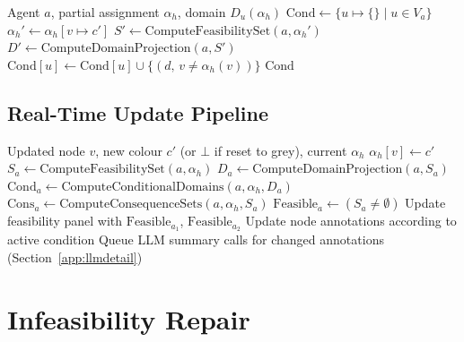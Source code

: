 \documentclass[10pt]{article}
\theoremstyle{definition}
\begin{document}
\begin{algorithm}
\caption{ComputeConditionalDomains: single-change conditional entries}
\label{alg:conditional}
\begin{algorithmic}[1]
\REQUIRE Agent $a$, partial assignment $\alpha_h$, domain $D_u(\alpha_h)$
\STATE $\mathrm{Cond} \gets \{u \mapsto \{\} \mid u \in V_a\}$
    \STATE $\alpha_h' \gets \alpha_h[v \mapsto c']$
    \STATE $S' \gets \text{ComputeFeasibilitySet}(a, \alpha_h')$
    \STATE $D' \gets \text{ComputeDomainProjection}(a, S')$
        \STATE $\mathrm{Cond}[u] \gets \mathrm{Cond}[u] \cup \{(d,\, v \neq \alpha_h(v))\}$
      \ENDFOR
    \ENDFOR
  \ENDFOR
\ENDFOR
\RETURN $\mathrm{Cond}$
\end{algorithmic}
\end{algorithm}

\subsection{Real-Time Update Pipeline}

\begin{algorithm}
\caption{OnNodeColourChange: pipeline triggered by human interaction}
\label{alg:pipeline}
\begin{algorithmic}[1]
\REQUIRE Updated node $v$, new colour $c'$ (or $\bot$ if reset to grey), current $\alpha_h$
\STATE $\alpha_h[v] \gets c'$
  \STATE $S_a \gets \text{ComputeFeasibilitySet}(a, \alpha_h)$
  \STATE $D_a \gets \text{ComputeDomainProjection}(a, S_a)$
    \STATE $\mathrm{Cond}_a \gets \text{ComputeConditionalDomains}(a, \alpha_h, D_a)$
  \ELSE
    \STATE $\mathrm{Cons}_a \gets \text{ComputeConsequenceSets}(a, \alpha_h, S_a)$
  \ENDIF
  \STATE $\mathrm{Feasible}_a \gets (S_a \neq \emptyset)$
\ENDFOR
\STATE Update feasibility panel with $\mathrm{Feasible}_{a_1}$, $\mathrm{Feasible}_{a_2}$
\STATE Update node annotations according to active condition
  \STATE Queue LLM summary calls for changed annotations (Section~\ref{app:llmdetail})
\ENDIF
\end{algorithmic}
\end{algorithm}

\section{Infeasibility Repair}
\label{app:repair}
\end{document}
